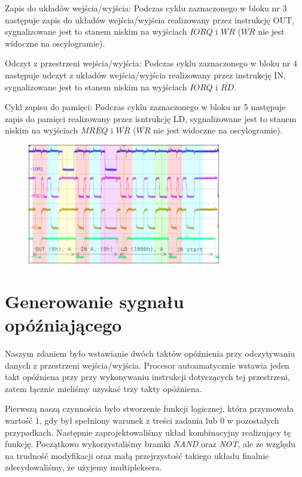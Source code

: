 \documentclass[fleqn]{article}
\begin{document}
Zapis do układów wejścia/wyjścia:
Podczas cyklu zaznaczonego w bloku nr 3 następuje zapis do układów wejścia/wyjścia realizowany przez instrukcję OUT, sygnalizowane jest to stanem niskim na wyjściach $\overline{IORQ}$ i $\overline{WR}$ ($\overline{WR}$ nie jest widoczne na oscylogramie).

Odczyt z przestrzeni wejścia/wyjścia:
Podczas cyklu zaznaczonego w bloku nr 4 następuje udczyt z układów wejścia/wyjścia realizowany przez instrukcję IN, sygnalizowane jest to stanem niskim na wyjściach $\overline{IORQ}$ i $\overline{RD}$.

Cykl zapisu do pamięci:
Podczas cyklu zaznaczonego w bloku nr 5 następuje zapis do pamięci realizowany przez isntrukcję LD, sygnalizowane jest to stanem niskim na wyjściach $\overline{MREQ}$ i $\overline{WR}$ ($\overline{WR}$ nie jest widoczne na oscylogramie).
   




\begin{figure}[H]
	\centering
	\includegraphics[width=0.75\textwidth]{img/1a.png}
	\caption{}
\end{figure}

\section{Generowanie sygnału opóźniającego}

Naszym zdaniem było wstawianie dwóch taktów opóźnienia przy odczytywaniu danych z przestrzeni wejścia/wyjścia. Procesor autoamatycznie wstawia jeden takt opóźniena przy przy wykonywaniu instrukcji dotyczących tej przestrzeni, zatem łącznie mieliśmy uzyskać trzy takty opóźniena.

Pierwszą naszą czynnościa było stworzenie funkcji logicznej, która przymowała wartość $1$, gdy był spełniony warunek z treści zadania lub $0$ w pozostałych przypadkach. Następnie zaprojektowaliśmy układ kombinacyjny realizujący tę funkcję. Początkowo wykorzystaliśmy bramki \textit{NAND} oraz \textit{NOT}, ale ze względu na trudność modyfikacji oraz małą przejrzystość takiego układu finalnie zdecydowaliśmy, że użyjemy multipleksera.
\end{document}
